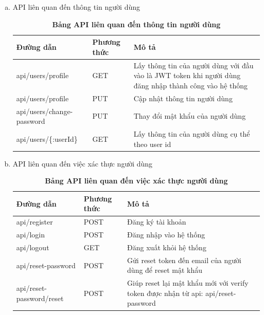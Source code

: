 \begin{enumerate}[a)]
  \item API liên quan đến thông tin người dùng
  

  \begin{table}[H]
    \centering
    \caption{\bfseries \fontsize{12pt}{0pt}\selectfont Bảng API liên quan đến thông tin người dùng}
    \begin{tabularx}{0.9\textwidth}{
    | >{\raggedright\arraybackslash}X
    | >{\raggedright\arraybackslash}m{2cm}
    | >{\raggedright\arraybackslash}X|
    }
    \hline
    \bfseries Đường dẫn    &\bfseries Phương thức    &\bfseries Mô tả\\ \hline
   api/users/profile   &   GET  &  Lấy thông tin của người dùng với đầu vào là JWT token khi người dùng đăng nhập thành công vào hệ thống \\  \hline
   api/users/profile   &    PUT    &  Cập nhật thông tin người dùng \\  \hline
   api/users/change-password   &   PUT     & Thay đổi mật khẩu của người dùng  \\ \hline
   api/users/\{:userId\}  &   GET     & Lấy thông tin của người dùng cụ thể theo user id \\ \hline

    \end{tabularx}
    \label{table_api_user}
\end{table}

\item API liên quan đến việc xác thực người dùng


\begin{table}[H]
  \centering
  \caption{\bfseries \fontsize{12pt}{0pt}\selectfont Bảng API liên quan đến việc xác thực người dùng}
  \begin{tabularx}{0.9\textwidth}{
  | >{\raggedright\arraybackslash}X
  | >{\raggedright\arraybackslash}m{2cm}
  | >{\raggedright\arraybackslash}X|
  }
  \hline
  \bfseries Đường dẫn    &\bfseries Phương thức    &\bfseries Mô tả\\ \hline
 api/register   &   POST  & Đăng ký tài khoản \\ \hline
 api/login   &    POST    & Đăng nhập vào hệ thống \\ \hline
 api/logout  &   GET     & Đăng xuất khỏi hệ thống \\ \hline
 api/reset-password  &     POST   &  Gửi reset token đến email của người dùng để reset mật khẩu \\  \hline
 api/reset-password/reset &   POST     & Giúp reset lại mật khẩu mới với verify token được nhận từ api: api/reset-password  \\ \hline


\end{tabularx}
\end{table}
\end{enumerate}
